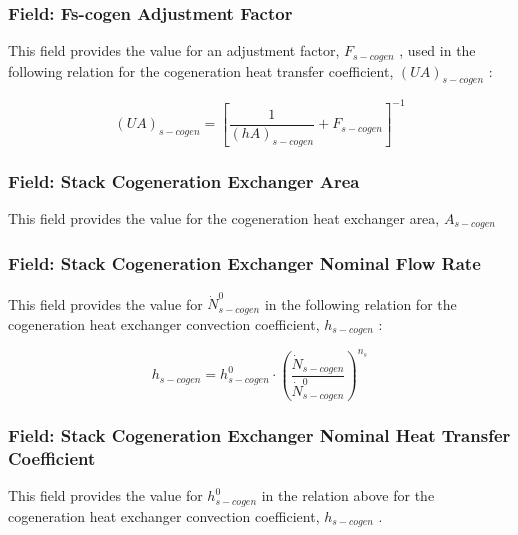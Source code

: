 \subsubsection{Field: Fs-cogen Adjustment Factor}\label{field-fs-cogen-adjustment-factor}

This field provides the value for an adjustment factor, \({F_{s - cogen}}\) , used in the following relation for the cogeneration heat transfer coefficient, \({\left( {UA} \right)_{s - cogen}}\) :

\begin{equation}
{\left( {UA} \right)_{s - cogen}} = {\left[ {\frac{1}{{{{\left( {hA} \right)}_{s - cogen}}}} + {F_{s - cogen}}} \right]^{ - 1}}
\end{equation}

\subsubsection{Field: Stack Cogeneration Exchanger Area}\label{field-stack-cogeneration-exchanger-area}

This field provides the value for the cogeneration heat exchanger area, \({A_{s - cogen}}\)

\subsubsection{Field: Stack Cogeneration Exchanger Nominal Flow Rate}\label{field-stack-cogeneration-exchanger-nominal-flow-rate}

This field provides the value for \(\dot N_{s - cogen}^0\) in the following relation for the cogeneration heat exchanger convection coefficient, \({h_{s - cogen}}\) :

\begin{equation}
{h_{s - cogen}} = h_{s - cogen}^0 \cdot {\left( {\frac{{{{\dot N}_{s - cogen}}}}{{\dot N_{s - cogen}^0}}} \right)^{{n_s}}}
\end{equation}

\subsubsection{Field: Stack Cogeneration Exchanger Nominal Heat Transfer Coefficient}\label{field-stack-cogeneration-exchanger-nominal-heat-transfer-coefficient}

This field provides the value for \(h_{s - cogen}^0\) in the relation above for the cogeneration heat exchanger convection coefficient, \({h_{s - cogen}}\) .

